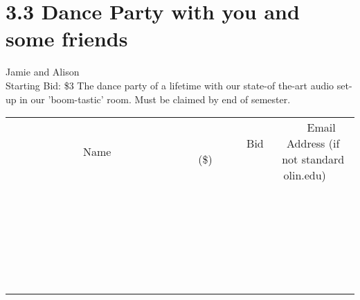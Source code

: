 \documentclass[11pt]{article}
\begin{document}
\section*{3.3 Dance Party  with you and some friends}
Jamie and Alison
\\
Starting Bid: \$3
\newline
The dance party of a lifetime with our state-of the-art audio set-up in our 'boom-tastic' room. Must be claimed by end of semester.
\\[6ex]
\begin{tabular}{c c c}
~~~~~~~~~~~~~Name~~~~~~~~~~~~~ & ~~~~~~~~~Bid (\$)~~~~~~~~~  & ~~~Email Address (if not standard olin.edu)~~~\\
 & & \\
\hline
 & & \\
\hline
 & & \\
\hline
 & & \\
\hline
 & & \\
\hline
 & & \\
\hline
 & & \\
\hline
 & & \\
\hline
 & & \\
\hline
 & & \\
\hline
 & & \\
\hline
 & & \\
\hline
 & & \\
\hline
 & & \\
\hline
 & & \\
\hline
 & & \\
\hline
 & & \\
\hline
 & & \\
\hline
 & & \\
\hline
 & & \\
\hline
 & & \\
\hline
 & & \\
\hline
 & & \\
\hline
 & & \\
\hline
 & & \\
\hline
 & & \\
\hline
\end{tabular}
\newpage
\end{document}
